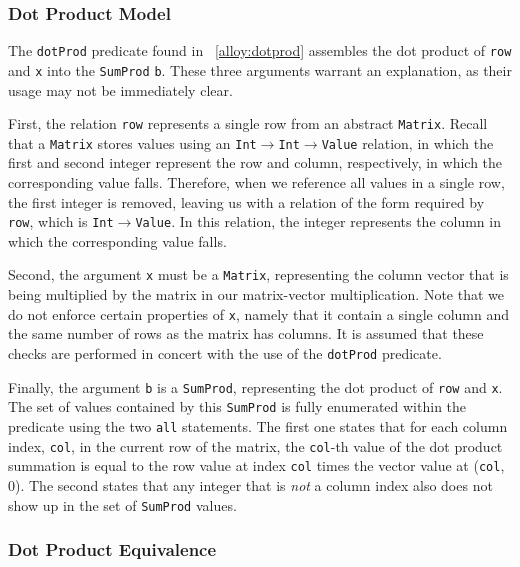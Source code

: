\documentclass[sigconf]{acmart}
\begin{document}
\subsubsection{Dot Product Model}
\label{sec:dotprod}

The \texttt{dotProd} predicate found in \figurename~\ref{alloy:dotprod} assembles the dot product of \texttt{row} and \texttt{x} into the \texttt{SumProd} \texttt{b}.  These three arguments warrant an explanation, as their usage may not be immediately clear.

First, the relation \texttt{row} represents a single row from an abstract \texttt{Matrix}.  Recall that a \texttt{Matrix} stores values using an \texttt{Int$\rightarrow$Int$\rightarrow$Value} relation, in which the first and second integer represent the row and column, respectively, in which the corresponding value falls.  Therefore, when we reference all values in a single row, the first integer is removed, leaving us with a relation of the form required by \texttt{row}, which is \texttt{Int$\rightarrow$Value}.  In this relation, the integer represents the column in which the corresponding value falls.

Second, the argument \texttt{x} must be a \texttt{Matrix}, representing the column vector that is being multiplied by the matrix in our matrix-vector multiplication.  Note that we do not enforce certain properties of \texttt{x}, namely that it contain a single column and the same number of rows as the matrix has columns.  It is assumed that these checks are performed in concert with the use of the \texttt{dotProd} predicate.

Finally, the argument \texttt{b} is a \texttt{SumProd}, representing the dot product of \texttt{row} and \texttt{x}.  The set of values contained by this \texttt{SumProd} is fully enumerated within the predicate using the two \texttt{all} statements.  The first one states that for each column index, \texttt{col}, in the current row of the matrix, the \texttt{col}-th value of the dot product summation is equal to the row value at index \texttt{col} times the vector value at (\texttt{col}, 0).  The second states that any integer that is \emph{not} a column index also does not show up in the set of \texttt{SumProd} values.

\subsubsection{Dot Product Equivalence}
\label{sec:valeqv}
\end{document}
